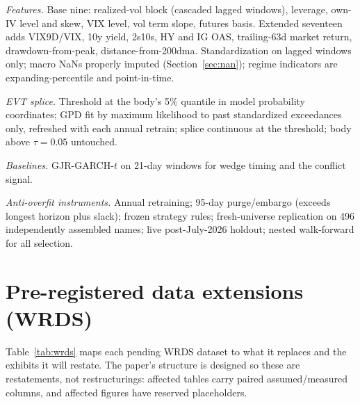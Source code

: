 \documentclass[11pt]{article}
\begin{document}
\emph{Features.} Base nine: realized-vol block (cascaded lagged windows), leverage, own-IV level and skew, VIX level, vol term slope, futures basis. Extended seventeen adds VIX9D/VIX, 10y yield, 2s10s, HY and IG OAS, trailing-63d market return, drawdown-from-peak, distance-from-200dma. Standardization on lagged windows only; macro NaNs properly imputed (Section~\ref{sec:nan}); regime indicators are expanding-percentile and point-in-time.

\emph{EVT splice.} Threshold at the body's 5\% quantile in model probability coordinates; GPD fit by maximum likelihood to past standardized exceedances only, refreshed with each annual retrain; splice continuous at the threshold; body above $\tau=0.05$ untouched.

\emph{Baselines.} GJR-GARCH-$t$ on 21-day windows \citep{glosten1993} for wedge timing and the conflict signal.

\emph{Anti-overfit instruments.} Annual retraining; 95-day purge/embargo (exceeds longest horizon plus slack); frozen strategy rules; fresh-universe replication on 496 independently assembled names; live post-July-2026 holdout; nested walk-forward for all selection.

\section{Pre-registered data extensions (WRDS)}\label{app:wrds}

Table~\ref{tab:wrds} maps each pending WRDS dataset to what it replaces and the exhibits it will restate. The paper's structure is designed so these are restatements, not restructurings: affected tables carry paired assumed/measured columns, and affected figures have reserved placeholders.
\end{document}
